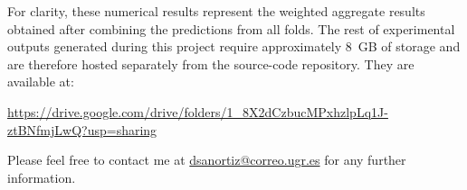 \clearpage

For clarity, these numerical results represent the weighted aggregate results obtained after combining the predictions from all folds. The rest of experimental outputs generated during this project require approximately 8~GB of storage and are therefore hosted separately from the source-code repository. They are available at:

\begin{center}
    \url{https://drive.google.com/drive/folders/1_8X2dCzbucMPxhzlpLq1J-ztBNfmjLwQ?usp=sharing}
\end{center}

Please feel free to contact me at \href{mailto:dsanortiz@correo.ugr.es}{dsanortiz@correo.ugr.es} for any further information.
